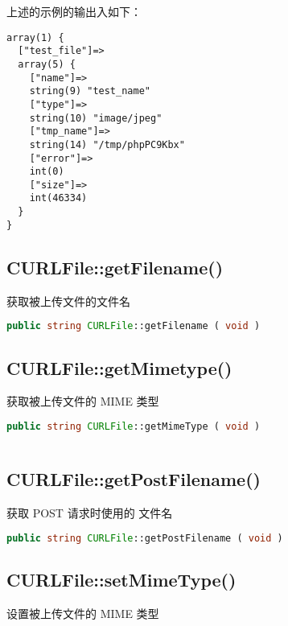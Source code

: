 上述的示例的输出入如下：

\begin{lstlisting}
array(1) {
  ["test_file"]=>
  array(5) {
    ["name"]=>
    string(9) "test_name"
    ["type"]=>
    string(10) "image/jpeg"
    ["tmp_name"]=>
    string(14) "/tmp/phpPC9Kbx"
    ["error"]=>
    int(0)
    ["size"]=>
    int(46334)
  }
}
\end{lstlisting}

\subsection{CURLFile::getFilename()}

获取被上传文件的文件名

\begin{lstlisting}[language=PHP]
public string CURLFile::getFilename ( void )
\end{lstlisting}




\subsection{CURLFile::getMimetype()}

获取被上传文件的 MIME 类型

\begin{lstlisting}[language=PHP]
public string CURLFile::getMimeType ( void )
\end{lstlisting}


\begin{lstlisting}[language=PHP]

\end{lstlisting}

\subsection{CURLFile::getPostFilename()}

获取 POST 请求时使用的 文件名

\begin{lstlisting}[language=PHP]
public string CURLFile::getPostFilename ( void )
\end{lstlisting}



\subsection{CURLFile::setMimeType()}

设置被上传文件的 MIME 类型

